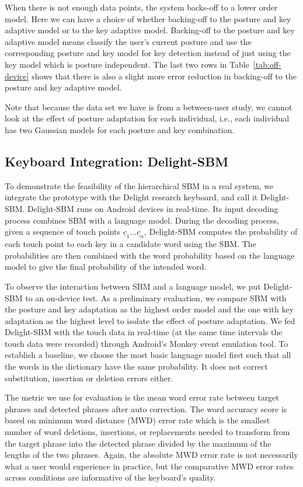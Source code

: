 \documentclass{sigchi}
\begin{document}
When there is not enough data points, the system backs-off to a lower order model.
Here we can have a choice of whether backing-off to the posture and key adaptive model or 
to the key adaptive model. Backing-off to the posture and key adaptive model means
classify the user's current posture and use the corresponding posture and key model for key detection instead
of just using the key model which is posture independent. The last two rows in 
Table~\ref{tab:off-device} shows that there is also a slight more error reduction  in backing-off to
the posture and key adaptive model.

Note that because the data set we have is from a between-user study, we cannot look
at the effect of posture adaptation for each individual, i.e., each individual has two Gaussian models
for each posture and key combination.

\subsection{Keyboard Integration: Delight-SBM}
To demonstrate the feasibility of the hierarchical SBM in a real system, we integrate the prototype with the Delight research keyboard, and call it Delight-SBM. 
Delight-SBM runs on Android devices in real-time. Its input decoding process combines SBM with a language model. During the decoding process, given a sequence
of touch points $\underline c_1\ldots\underline c_n$, Delight-SBM computes 
the probability of each touch point to
each key in a candidate word using the SBM.
The probabilities are then combined with the word probability based on the 
language model to give the final probability of the intended word.

To observe the interaction between SBM and a language model, we put Delight-SBM to an on-device test. As a preliminary evaluation, we compare SBM with the posture and key adaptation as the highest order model and the one with key adaptation as the highest level to isolate the effect of posture adaptation. We fed Delight-SBM with the touch data in real-time (at the same time intervals the touch data were recorded) through Android’s Monkey event emulation tool. To establish a baseline, we choose the most basic language model first such that all the words in the dictionary have the same probability. It does not correct substitution, insertion or deletion errors either. 

The metric we use for evaluation is the mean word error rate between target phrases and detected phrases after auto correction. The word accuracy score is based on minimum
word distance (MWD) error rate which is the smallest number of word deletions, insertions, or replacements needed to transform
from the target phrase into the detected phrase divided by the maximum of the 
lengths of the two phrases. Again, the absolute MWD error rate is not necessarily what a user would experience in practice, but the comparative MWD error rates across conditions are informative of the keyboard’s quality.
\end{document}
